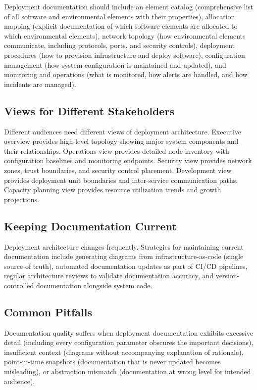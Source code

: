\documentclass[11pt]{article}
\begin{document}
Deployment documentation should include an element catalog (comprehensive list of all software and environmental elements with their properties), allocation mapping (explicit documentation of which software elements are allocated to which environmental elements), network topology (how environmental elements communicate, including protocols, ports, and security controls), deployment procedures (how to provision infrastructure and deploy software), configuration management (how system configuration is maintained and updated), and monitoring and operations (what is monitored, how alerts are handled, and how incidents are managed).

\subsection{Views for Different Stakeholders}

Different audiences need different views of deployment architecture. Executive overview provides high-level topology showing major system components and their relationships. Operations view provides detailed node inventory with configuration baselines and monitoring endpoints. Security view provides network zones, trust boundaries, and security control placement. Development view provides deployment unit boundaries and inter-service communication paths. Capacity planning view provides resource utilization trends and growth projections.

\subsection{Keeping Documentation Current}

Deployment architecture changes frequently. Strategies for maintaining current documentation include generating diagrams from infrastructure-as-code (single source of truth), automated documentation updates as part of CI/CD pipelines, regular architecture reviews to validate documentation accuracy, and version-controlled documentation alongside system code.

\subsection{Common Pitfalls}

Documentation quality suffers when deployment documentation exhibits excessive detail (including every configuration parameter obscures the important decisions), insufficient context (diagrams without accompanying explanation of rationale), point-in-time snapshots (documentation that is never updated becomes misleading), or abstraction mismatch (documentation at wrong level for intended audience).
\end{document}
